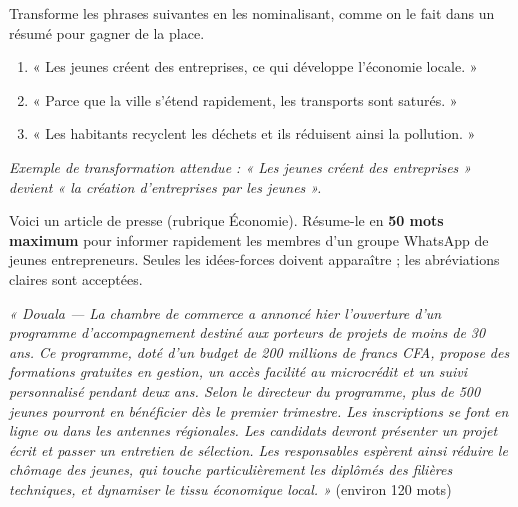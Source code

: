 \documentclass[11pt]{article}
\newcounter{popsec}
\newcounter{popsub}
\newcommand{\courssub}[1]{%
  \stepcounter{popsub}%
  \par\vspace{9pt}\noindent{\popxbold\fontsize{11.5}{13}\selectfont\color{popink}{\color{poporange}\thepopsec.\thepopsub}\hspace{6pt}#1}\par\nopagebreak\vspace{4pt}
}
\begin{document}
\begin{exercice}[Nominalisation]
Transforme les phrases suivantes en les nominalisant, comme on le fait dans un résumé pour gagner de la place.
\begin{enumerate}
\item « Les jeunes créent des entreprises, ce qui développe l'économie locale. »
\item « Parce que la ville s'étend rapidement, les transports sont saturés. »
\item « Les habitants recyclent les déchets et ils réduisent ainsi la pollution. »
\end{enumerate}
\emph{Exemple de transformation attendue : « Les jeunes créent des entreprises » devient « la création d'entreprises par les jeunes ».}
\end{exercice}

\begin{exercice}
Voici un article de presse (rubrique Économie). Résume-le en \textbf{50 mots maximum} pour informer rapidement les membres d'un groupe WhatsApp de jeunes entrepreneurs. Seules les idées-forces doivent apparaître ; les abréviations claires sont acceptées.

\emph{« Douala — La chambre de commerce a annoncé hier l'ouverture d'un programme d'accompagnement destiné aux porteurs de projets de moins de 30 ans. Ce programme, doté d'un budget de 200 millions de francs CFA, propose des formations gratuites en gestion, un accès facilité au microcrédit et un suivi personnalisé pendant deux ans. Selon le directeur du programme, plus de 500 jeunes pourront en bénéficier dès le premier trimestre. Les inscriptions se font en ligne ou dans les antennes régionales. Les candidats devront présenter un projet écrit et passer un entretien de sélection. Les responsables espèrent ainsi réduire le chômage des jeunes, qui touche particulièrement les diplômés des filières techniques, et dynamiser le tissu économique local. »} (environ 120 mots)
\end{exercice}

\courssub{Je me prépare au Bac}
\end{document}
